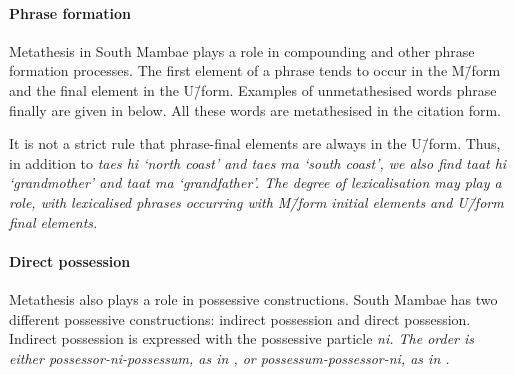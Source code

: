 \paragraph{Phrase formation}\label{sec:PhrFor}
Metathesis in South Mambae plays a role in compounding
and other phrase formation processes.
The first element of a phrase tends
to occur in the M\=/form and the final element in the U\=/form.
Examples of unmetathesised words phrase finally
are given in  below.
All these words are metathesised in the citation form.

\begin{exe}
	\label{ex:MamPhrFor}
\end{exe}

It is not a strict rule that phrase-final elements are always in the U\=/form.
Thus, in addition to \it{taes hi} `north coast'
and \it{taes ma} `south coast',
we also find \it{taat hi} `grandmother' and \it{taat ma} `grandfather'.
The degree of lexicalisation may play a role,
with lexicalised phrases occurring with M\=/form initial elements
and U\=/form final elements.

\paragraph{Direct possession}\label{sec:InaPos}
Metathesis also plays a role in possessive constructions.
South Mambae has two different possessive constructions:
indirect possession and direct possession.
Indirect possession is expressed with the possessive particle \it{ni}.
The order is either possessor-\it{ni}-possessum,
as in , or possessum-possessor-\it{ni},
as in .

